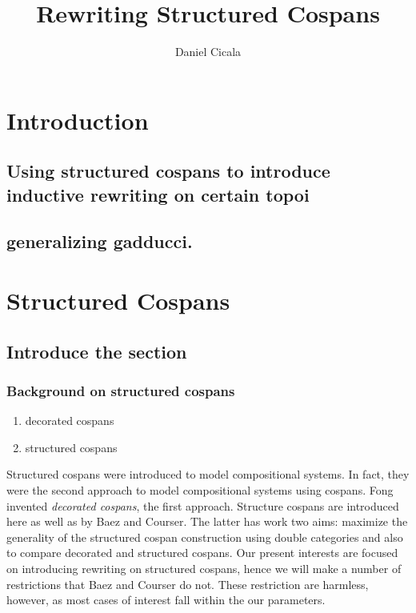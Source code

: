 \documentclass{amsart}
\author{Daniel Cicala}
\title{Rewriting Structured Cospans}
\theoremstyle{remark}
\theoremstyle{definition}
\begin{document}
\maketitle{}


\section{Introduction}
\label{sec-1}
\subsection{Using structured cospans to introduce inductive rewriting on certain topoi}
\label{sec-1-1}
\subsection{generalizing gadducci.}
\label{sec-1-2}


\section{Structured Cospans}
\label{sec:StrCsp}


\subsection{Introduce the section}
\label{sec-2-1}

\subsubsection{Background on structured cospans}
\label{sec-2-1-1}
\begin{enumerate}
\item decorated cospans
\label{sec-2-1-1-1}
\item structured cospans
\label{sec-2-1-1-2}
\end{enumerate}

Structured cospans were introduced to model compositional systems. In
fact, they were the second approach to model compositional systems
using cospans. Fong invented \emph{decorated cospans},
%
%
the first approach.  Structure cospans are
introduced here as well as by Baez and Courser.
%
%
The latter has work two aims: maximize the
generality of the structured cospan construction using double
categories and also to compare decorated and structured cospans. Our
present interests are focused on introducing rewriting on structured
cospans, hence we will make a number of restrictions that Baez and
Courser do not.  These restriction are harmless, however, as most
cases of interest fall within the our parameters.
\end{document}
